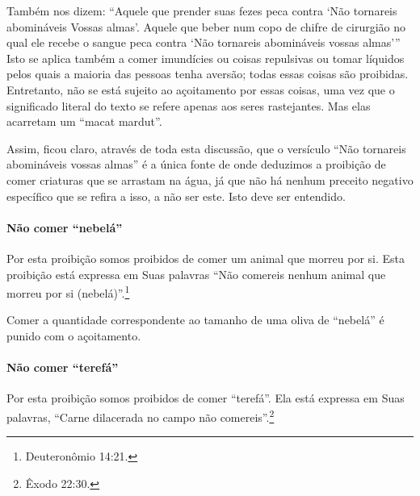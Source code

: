 Também nos dizem: ``Aquele que prender suas fezes peca contra `Não
tornareis abomináveis Vossas almas'. Aquele que beber num copo de chifre
de cirurgião no qual ele recebe o sangue peca contra `Não tornareis
abomináveis vossas almas''' Isto se aplica também a comer imundícies ou
coisas repulsivas ou tomar líquidos pelos quais a maioria das pessoas
tenha aversão; todas essas coisas são proibidas. Entretanto, não se está
sujeito ao açoitamento por essas coisas, uma vez que o significado
literal do texto se refere apenas aos seres rastejantes. Mas elas
acarretam um ``macat mardut''.

Assim, ficou claro, através de toda esta discussão, que o versículo
``Não tornareis abomináveis vossas almas'' é a única fonte de onde
deduzimos a proibição de comer criaturas que se arrastam na água, já que
não há nenhum preceito negativo específico que se refira a isso, a não
ser este. Isto deve ser entendido.

\paragraph{Não comer ``nebelá''}

Por esta proibição somos proibidos de comer um animal que morreu por
si. Esta proibição está expressa em Suas palavras ``Não comereis nenhum
animal que morreu por si (nebelá)''.\footnote{Deuteronômio 14:21.}

Comer a quantidade correspondente ao tamanho de uma oliva de ``nebelá''
é punido com o açoitamento.

\paragraph{Não comer ``terefá''}

Por esta proibição somos proibidos de comer ``terefá''. Ela está
expressa em Suas palavras, ``Carne dilacerada no campo não comereis''.\footnote{Êxodo 22:30.}

